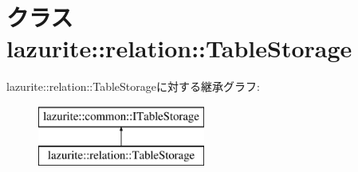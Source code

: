 \hypertarget{classlazurite_1_1relation_1_1_table_storage}{
\section{クラス lazurite::relation::TableStorage}
\label{classlazurite_1_1relation_1_1_table_storage}
}
lazurite::relation::TableStorageに対する継承グラフ:\begin{figure}[H]
\begin{center}
\leavevmode
\includegraphics[height=2cm]{classlazurite_1_1relation_1_1_table_storage}
\end{center}
\end{figure}
